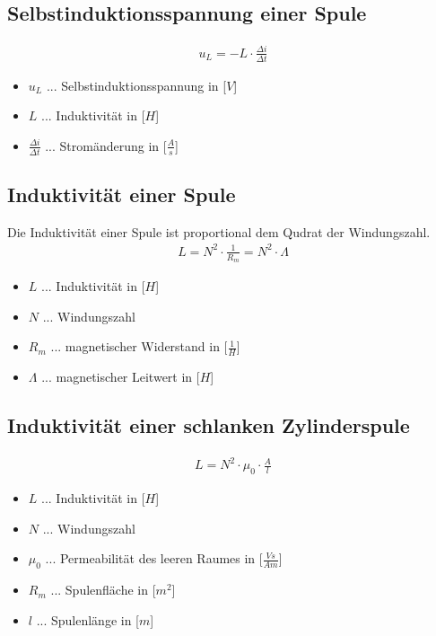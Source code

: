 \subsection{Selbstinduktionsspannung einer Spule}
\begin{align}
    u_L = -L \cdot \frac{\Delta i}{\Delta t}
\end{align}
\begin{itemize}
    \item $u_L$ ... Selbstinduktionsspannung in [$V$]
    \item $L$ ... Induktivität in [$H$]
    \item $\frac{\Delta i}{\Delta t}$ ... Stromänderung in [$\frac{A}{s}$]
\end{itemize}

\subsection{Induktivität einer Spule}
Die Induktivität einer Spule ist proportional dem Qudrat der Windungszahl.
\begin{align}
    L=N^2\cdot \frac{1}{R_m}=N^2\cdot \Lambda
\end{align}
\begin{itemize}
    \item $L$ ... Induktivität in [$H$]
    \item $N$ ... Windungszahl
    \item $R_m$ ... magnetischer Widerstand in [$\frac{1}{H}$]
    \item $\Lambda$ ... magnetischer Leitwert in [$H$]
\end{itemize}

\subsection{Induktivität einer schlanken Zylinderspule}
\begin{align}
    L=N^2\cdot\mu_0\cdot \frac{A}{l}
\end{align}
\begin{itemize}
    \item $L$ ... Induktivität in [$H$]
    \item $N$ ... Windungszahl
    \item $\mu_0$ ... Permeabilität des leeren Raumes in [$\frac{Vs}{Am}$]
    \item $R_m$ ... Spulenfläche in [$m^2$]
    \item $l$ ... Spulenlänge in [$m$]
\end{itemize}

